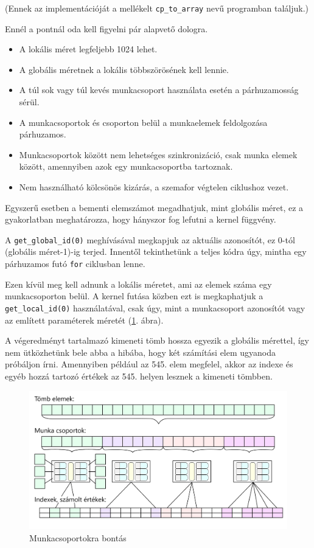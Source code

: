 \noindent (Ennek az implementációját a mellékelt \texttt{cp\_to\_array} nevű programban találjuk.)

Ennél a pontnál oda kell figyelni pár alapvető dologra.
\begin{itemize}
\item A lokális méret legfeljebb 1024 lehet.
\item A globális méretnek a lokális többszörösének kell lennie.
\item A túl sok vagy túl kevés munkacsoport használata esetén a párhuzamosság sérül.
\item A munkacsoportok és csoporton belül a munkaelemek feldolgozása párhuzamos.
\item Munkacsoportok között nem lehetséges szinkronizáció, csak munka elemek között, amennyiben azok egy munkacsoportba tartoznak.
\item Nem használható kölcsönös kizárás, a szemafor végtelen ciklushoz vezet.
\end{itemize}


Egyszerű esetben a bementi elemszámot megadhatjuk, mint globális méret, ez a gyakorlatban meghatározza, hogy hányszor fog lefutni a kernel függvény.

A \texttt{get\_global\_id(0)} meghívásával megkapjuk az aktuális azonosítót, ez 0-tól (globális méret-1)-ig terjed. Innentől tekinthetünk a teljes kódra úgy, mintha egy párhuzamos futó \texttt{for} ciklusban lenne.

Ezen kívül meg kell adnunk a lokális méretet, ami az elemek száma egy munkacsoporton belül. A kernel futása közben ezt is megkaphatjuk a \texttt{get\_local\_id(0)} használatával, csak úgy, mint a munkacsoport azonosítót vagy az említett paraméterek méretét (\ref{fig:workgroups_black}. ábra).

A végeredményt tartalmazó kimeneti tömb hossza egyezik a globális mérettel, így nem ütközhetünk bele abba a hibába, hogy két számítási elem ugyanoda próbáljon írni. Amennyiben például az 545. elem megfelel, akkor az indexe és egyéb hozzá tartozó értékek az 545. helyen lesznek a kimeneti tömbben.

\begin{figure}[h!]
\centering
\includegraphics[width=\textwidth]{images/workgroups_black.png}
\caption{Munkacsoportokra bontás}
\label{fig:workgroups_black}
\end{figure}

